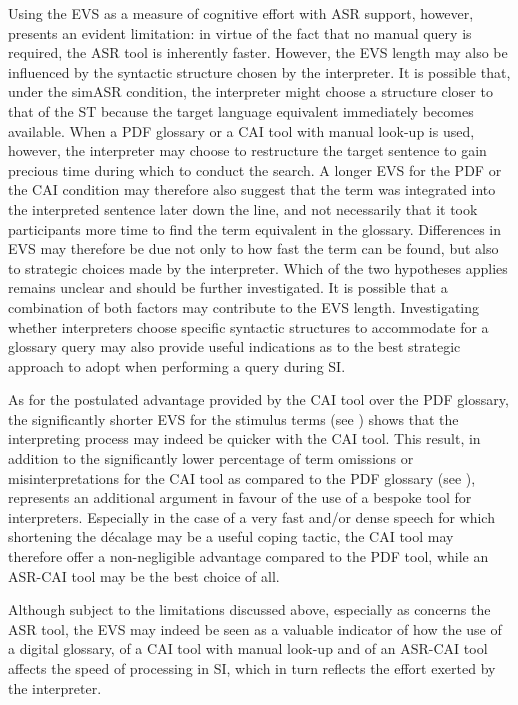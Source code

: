 Using the EVS as a measure of cognitive effort with ASR support, however, presents an evident limitation: in virtue of the fact that no manual query is required, the ASR tool is inherently faster. However, the EVS length may also be influenced by the syntactic structure chosen by the interpreter. It is possible that, under the simASR condition, the interpreter might choose a structure closer to that of the ST because the target language equivalent immediately becomes available. When a PDF glossary or a CAI tool with manual look-up is used, however, the interpreter may choose to restructure the target sentence to gain precious time during which to conduct the search. A longer EVS for the PDF or the CAI condition may therefore also suggest that the term was integrated into the interpreted sentence later down the line, and not necessarily that it took participants more time to find the term equivalent in the glossary. Differences in EVS may therefore be due not only to how fast the term can be found, but also to strategic choices made by the interpreter. Which of the two hypotheses applies remains unclear and should be further investigated. It is possible that a combination of both factors may contribute to the EVS length. Investigating whether interpreters choose specific syntactic structures to accommodate for a glossary query may also provide useful indications as to the best strategic approach to adopt when performing a query during SI.\largerpage

As for the postulated advantage provided by the CAI tool over the PDF glossary, the significantly shorter EVS for the stimulus terms (see ) shows that the interpreting process may indeed be quicker with the CAI tool. This result, in addition to the significantly lower percentage of term omissions or misinterpretations for the CAI tool as compared to the PDF glossary (see ), represents an additional argument in favour of the use of a bespoke tool for interpreters. Especially in the case of a very fast and/or dense speech for which shortening the décalage may be a useful coping tactic, the CAI tool may therefore offer a non-negligible advantage compared to the PDF tool, while an ASR-CAI tool may be the best choice of all.

Although subject to the limitations discussed above, especially as concerns the ASR tool, the EVS may indeed be seen as a valuable indicator of how the use of a digital glossary, of a CAI tool with manual look-up and of an ASR-CAI tool affects the speed of processing in SI, which in turn reflects the effort exerted by the interpreter.

